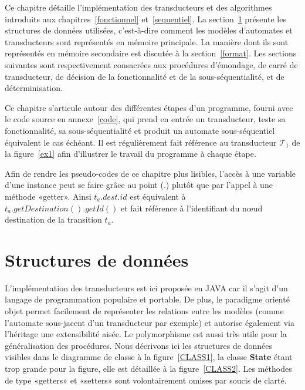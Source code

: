 \label{implementation}

Ce chapitre détaille l'implémentation des transducteurs et des algorithmes introduits aux chapitres~\ref{fonctionnel} et~\ref{sequentiel}. La section~\ref{struct} présente les structures de données utilisées, c'est-à-dire comment les modèles d'automates et transducteurs sont représentés en mémoire principale. La manière dont ils sont représentés en mémoire secondaire est discutée à la section~\ref{format}. Les sections suivantes sont respectivement consacrées aux procédures d'émondage, de carré de transducteur, de décision de la fonctionnalité et de la sous-séquentialité, et de déterminisation.

Ce chapitre s'articule autour des différentes étapes d'un programme, fourni avec le code source en annexe~\ref{code}, qui prend en entrée un transducteur, teste sa fonctionnalité, sa sous-séquentialité et produit un automate sous-séquentiel équivalent le cas échéant. Il est régulièrement fait référence au transducteur $\mathscr{T}_1$ de la figure~\ref{ex1} afin d'illustrer le travail du programme à chaque étape.

Afin de rendre les pseudo-codes de ce chapitre plus lisibles, l'accès à une variable d'une instance peut se faire grâce au point ($.$) plutôt que par l'appel à une méthode «getter». Ainsi $t_a.dest.id$ est équivalent à $t_a.getDestination().getId()$ et fait référence à l'identifiant du nœud destination de la transition $t_a$.



\section{Structures de données}
\label{struct}

	L'implémentation des transducteurs est ici proposée en JAVA car il s'agit d'un langage de programmation populaire et portable. De plus, le paradigme orienté objet  permet facilement de représenter les relations entre les modèles (comme l'automate sous-jacent d'un transducteur par exemple) et autorise également via l'héritage une extensibilité aisée. Le polymorphisme est aussi très utile pour la généralisation des procédures. Nous décrivons ici les structures de données visibles dans le diagramme de classe à la figure~\ref{CLASS1}, la classe \textbf{State} étant trop grande pour la figure, elle est détaillée à la figure~\ref{CLASS2}. Les méthodes de type «getters» et «setters» sont volontairement omises par soucis de clarté.
	
